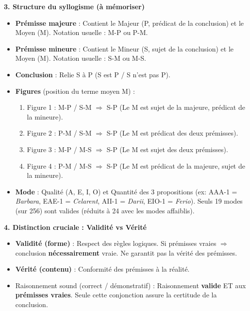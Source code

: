 \documentclass[11pt]{article}
\newcommand{\cle}[1]{{\popxbold\color{popdark}#1}}
\begin{document}
\begin{bilan}
\textbf{3. Structure du syllogisme (à mémoriser)}
\begin{itemize}
  \item \textbf{Prémisse majeure} : Contient le Majeur (P, prédicat de la conclusion) et le Moyen (M). Notation usuelle : M-P ou P-M.
  \item \textbf{Prémisse mineure} : Contient le Mineur (S, sujet de la conclusion) et le Moyen (M). Notation usuelle : S-M ou M-S.
  \item \textbf{Conclusion} : Relie S à P (S est P / S n'est pas P).
  \item \textbf{Figures} (position du terme moyen M) :
  \begin{enumerate}
    \item Figure 1 : M-P / S-M $\Rightarrow$ S-P (Le M est sujet de la majeure, prédicat de la mineure).
    \item Figure 2 : P-M / S-M $\Rightarrow$ S-P (Le M est prédicat des deux prémisses).
    \item Figure 3 : M-P / M-S $\Rightarrow$ S-P (Le M est sujet des deux prémisses).
    \item Figure 4 : P-M / M-S $\Rightarrow$ S-P (Le M est prédicat de la majeure, sujet de la mineure).
  \end{enumerate}
  \item \textbf{Mode} : Qualité (A, E, I, O) et Quantité des 3 propositions (ex: AAA-1 = \textit{Barbara}, EAE-1 = \textit{Celarent}, AII-1 = \textit{Darii}, EIO-1 = \textit{Ferio}). Seuls 19 modes (sur 256) sont valides (réduits à 24 avec les modes affaiblis).
\end{itemize}

\textbf{4. Distinction cruciale : Validité vs Vérité}
\begin{itemize}
  \item \textbf{Validité (forme)} : Respect des règles logiques. Si prémisses vraies $\Rightarrow$ conclusion \textbf{nécessairement} vraie. Ne garantit pas la vérité des prémisses.
  \item \textbf{Vérité (contenu)} : Conformité des prémisses à la réalité.
  \item \cle{Raisonnement sound (correct / démonstratif)} : Raisonnement \textbf{valide} ET aux \textbf{prémisses vraies}. Seule cette conjonction assure la certitude de la conclusion.
\end{itemize}


\end{bilan}
\end{document}
